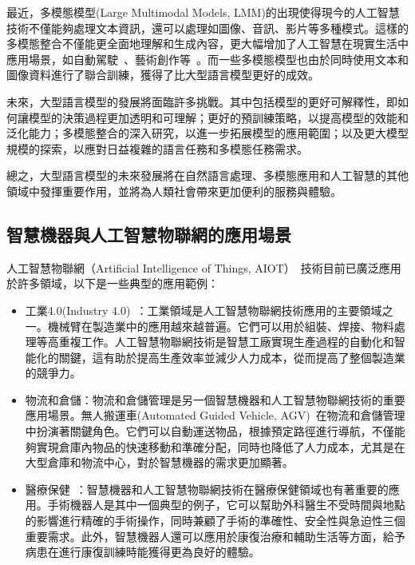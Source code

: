 \documentclass[class=NCU_thesis, crop=false]{standalone}
\begin{document}
最近，多模態模型(Large Multimodal Models, LMM)的出現使得現今的人工智慧技術不僅能夠處理文本資訊，還可以處理如圖像、音訊、影片等多種模式。這樣的多模態整合不僅能更全面地理解和生成內容，更大幅增加了人工智慧在現實生活中應用場景，如自動駕駛~\cite{cui2023survey}、藝術創作等~\cite{cai2023benchlmm}。而一些多模態模型也由於同時使用文本和圖像資料進行了聯合訓練，獲得了比大型語言模型更好的成效。

未來，大型語言模型的發展將面臨許多挑戰。其中包括模型的更好可解釋性，即如何讓模型的決策過程更加透明和可理解；更好的預訓練策略，以提高模型的效能和泛化能力；多模態整合的深入研究，以進一步拓展模型的應用範圍；以及更大模型規模的探索，以應對日益複雜的語言任務和多模態任務需求。

總之，大型語言模型的未來發展將在自然語言處理、多模態應用和人工智慧的其他領域中發揮重要作用，並將為人類社會帶來更加便利的服務與體驗。

\subsection{智慧機器與人工智慧物聯網的應用場景}

人工智慧物聯網（Artificial Intelligence of Things, AIOT）~\cite{9264235}技術目前已廣泛應用於許多領域，以下是一些典型的應用範例：

\begin{itemize}
    \item 工業4.0(Industry 4.0)~\cite{9695219}：工業領域是人工智慧物聯網技術應用的主要領域之一。機械臂在製造業中的應用越來越普遍。它們可以用於組裝、焊接、物料處理等高重複工作。人工智慧物聯網技術是智慧工廠實現生產過程的自動化和智能化的關鍵，這有助於提高生產效率並減少人力成本，從而提高了整個製造業的競爭力。

    \item 物流和倉儲：物流和倉儲管理是另一個智慧機器和人工智慧物聯網技術的重要應用場景。無人搬運車(Automated Guided Vehicle, AGV)~\cite{10021117}在物流和倉儲管理中扮演著關鍵角色。它們可以自動運送物品，根據預定路徑進行導航，不僅能夠實現倉庫內物品的快速移動和準確分配，同時也降低了人力成本，尤其是在大型倉庫和物流中心，對於智慧機器的需求更加顯著。

    \item 醫療保健~\cite{8893884}：智慧機器和人工智慧物聯網技術在醫療保健領域也有著重要的應用。手術機器人是其中一個典型的例子，它可以幫助外科醫生不受時間與地點的影響進行精確的手術操作，同時兼顧了手術的準確性、安全性與急迫性三個重要需求。此外，智慧機器人還可以應用於康復治療和輔助生活等方面，給予病患在進行康復訓練時能獲得更為良好的體驗。
\end{itemize}
\end{document}

